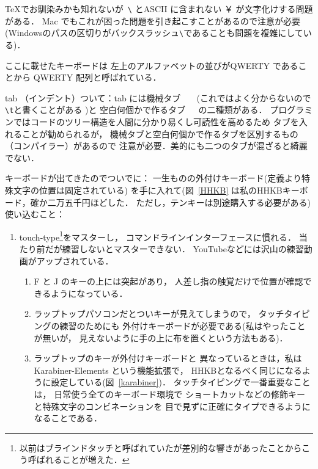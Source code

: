 \begin{itemize}
   \TeX でお馴染みかも知れないが\verb/ \/ とASCII に含まれない ￥
   が文字化けする問題がある．
   Mac でもこれが困った問題を引き起こすことがあるので注意が必要
   (Windowsのパスの区切りがバックスラッシュ\verb/\/であることも問題を複雑にしている)．
   
   ここに載せたキーボードは
   左上のアルファベットの並びがQWERTY であることから
   QWERTY 配列と呼ばれている．

   tab （インデント）ついて：tab には機械タブ\verb/   /
   (これではよく分からないので\verb/\t/と書くことがある )と
   空白何個かで作るタブ\verb/   /の二種類がある．
   プログラミンではコードのツリー構造を人間に分かり易くし可読性を高めるため
   タブを入れることが勧められるが，
   機械タブと空白何個かで作るタブを区別するもの（コンパイラー）があるので
   注意が必要．美的にも二つのタブが混ざると綺麗でない．
   
   \emptyline 
     キーボードが出てきたのでついでに：     
     一生ものの外付けキーボード(定義より特殊文字の位置は固定されている)
     を手に入れて(図~\ref{HHKB}
     は私のHHKBキーボード，確か二万五千円ほどした．
     ただし，テンキーは別途購入する必要がある)
     使い込むこと：
     

   \begin{enumerate}
      \item
         touch-type\footnote{以前はブラインドタッチと呼ばれていたが差別的な響きがあったことからこう呼ばれることが増えた．}をマスターし，
         コマンドラインインターフェースに慣れる．
         当たり前だが練習しないとマスターできない．
         YouTubeなどには沢山の練習動画がアップされている．
         \begin{enumerate}
            \item
               F と J のキーの上には突起があり，
               人差し指の触覚だけで位置が確認できるようになっている．
            \item
               ラップトップパソコンだとついキーが見えてしまうので，
               タッチタイピングの練習のためにも
               外付けキーボードが必要である(私はやったことが無いが，
               見えないように手の上に布を置くという方法もある)．
            \item
               ラップトップのキーが外付けキーボードと
               異なっているときは，私は
               Karabiner-Elements という機能拡張で，
               HHKBとなるべく同じになるように設定している(図~\ref{karabiner})．
               タッチタイピングで一番重要なことは，
               日常使う全てのキーボード環境で
               ショートカットなどの修飾キーと特殊文字のコンビネーションを
               目で見ずに正確にタイプできるようになることである．


\end{enumerate}
\end{enumerate}
\end{itemize}
